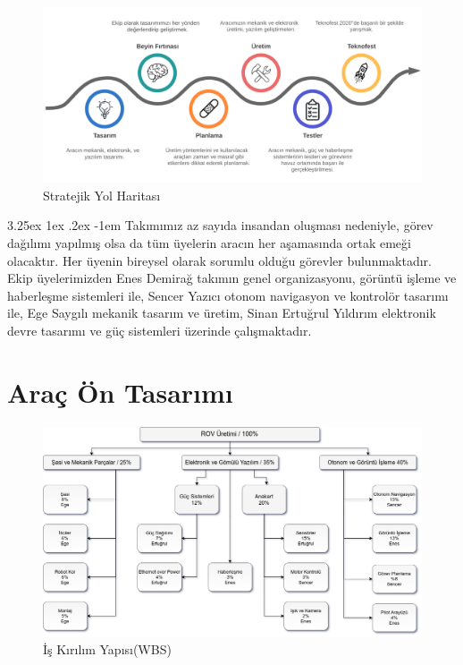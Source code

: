 \documentclass[12pt]{article}
\makeatletter
\renewcommand\paragraph{\@startsection{paragraph}{5}{\z@}%
  {3.25ex \@plus1ex \@minus.2ex}%
  {-1em}%
  {\normalfont\normalsize\bfseries}}
\makeatother
\begin{document}
\begin{figure}[hbt!]
\centering
\includegraphics[width=1\textwidth]{timeline.png}
\caption{Stratejik Yol Haritası}
\label{fig:path}
\end{figure}

\paragraph{} Takımımız az sayıda insandan oluşması nedeniyle, görev dağılımı yapılmış olsa da tüm üyelerin aracın her aşamasında ortak emeği olacaktır. Her üyenin bireysel olarak sorumlu olduğu görevler bulunmaktadır. Ekip üyelerimizden Enes Demirağ takımın genel organizasyonu, görüntü işleme ve haberleşme sistemleri ile, Sencer Yazıcı otonom navigasyon ve kontrolör tasarımı ile, Ege Saygılı mekanik tasarım ve üretim, Sinan Ertuğrul Yıldırım elektronik devre tasarımı ve güç sistemleri üzerinde çalışmaktadır.



\section{Araç Ön Tasarımı}

\begin{figure}[hbt!]
\centering
\includegraphics[width=1\textwidth]{WBS-v2.png}
\caption{İş Kırılım Yapısı(WBS)}
\label{fig:wbs}
\end{figure}
\end{document}
